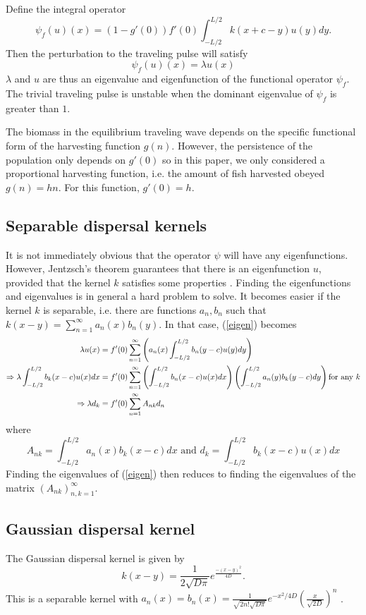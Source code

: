 \documentclass[12pt,english]{article}
\begin{document}
Define the integral operator
$$ \psi_f(u)(x)=(1-g'(0))f'(0)\int_{-L/2}^{L/2}k(x+c-y)u(y)dy. $$
Then the perturbation to the traveling pulse will satisfy 
\begin{equation} \psi_f(u)(x)=\lambda u(x) \label{eigen} \end{equation}
$\lambda$ and $u$ are thus an eigenvalue and eigenfunction of the functional operator $\psi_f$.  The trivial traveling pulse is unstable when the dominant eigenvalue of $\psi_f$ is greater than $1$.


The biomass in the equilibrium traveling wave depends on the specific functional form of the harvesting function $g(n)$.  However, the persistence of the population only depends on $g'(0)$ so in this paper, we only considered a proportional harvesting function, i.e. the amount of fish harvested obeyed $g(n)=hn$.  For this function, $g'(0)=h$.  

\subsection{Separable dispersal kernels \label{sep}}
It is not immediately obvious that the operator $\psi$ will have any eigenfunctions.  However, Jentzsch's theorem guarantees that there is an eigenfunction $u$, provided that the kernel $k$ satisfies some properties \citep{ZhouKot2011}.  Finding the eigenfunctions and eigenvalues is in general a hard problem to solve.  It becomes easier if the kernel $k$ is separable, i.e. there are functions $a_n,b_n$ such that $k(x-y)=\sum_{n=1}^\infty a_n(x)b_n(y)$.  In that case, (\ref{eigen}) becomes
\begin{align}
\lambda u(x)&=f'(0)\sum_{n=1}^\infty\left( a_n(x)\int_{-L/2}^{L/2}b_n(y-c)u(y)dy\right) \notag
\\ \Rightarrow \lambda\int_{-L/2}^{L/2}b_k(x-c)u(x)dx&=f'(0)\sum_{n=1}^{\infty}\left(\int_{-L/2}^{L/2}b_n(x-c)u(x)dx\right)\left(\int_{-L/2}^{L/2}a_n(y)b_k(y-c)dy\right) \notag \text{for any $k$}
\\ \Rightarrow \lambda d_k&=f'(0)\sum_{n=1}^\infty A_{nk}d_n  \label{problem}
\end{align}
where
\begin{equation*}
A_{nk}=\int_{-L/2}^{L/2}a_n(x)b_k(x-c)dx \text{ and } d_k=\int_{-L/2}^{L/2}b_k(x-c)u(x)dx
\end{equation*}
Finding the eigenvalues of (\ref{eigen}) then reduces to finding the eigenvalues of the matrix $(A_{nk})_{n,k=1}^\infty$.

\subsection{Gaussian dispersal kernel \label{gausapp}}
The Gaussian dispersal kernel is given by
$$k(x-y)=\frac{1}{2\sqrt{D\pi}}e^{\frac{-(x-y)^2}{4D}}.$$
This is a separable kernel with
$a_n(x)=b_n(x)=\frac{1}{\sqrt{2n!\sqrt{D\pi}}}e^{-x^2/4D}\left(\frac{x}{\sqrt{2D}}\right)^n$ \citep{Latore:1998fk}.
\end{document}
